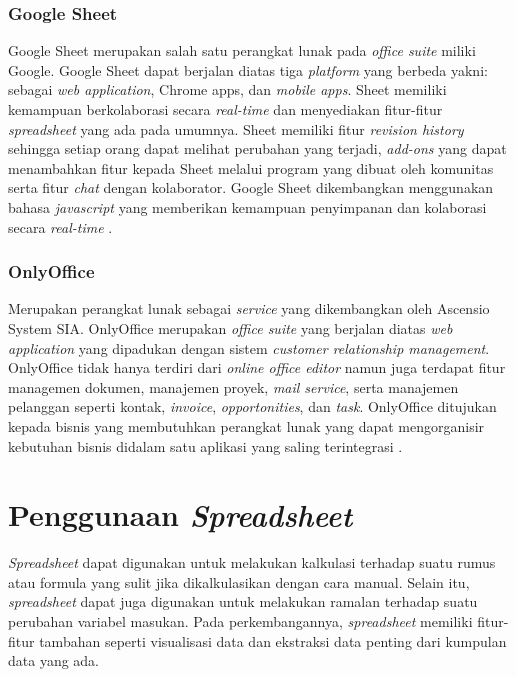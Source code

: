     \subsubsection{Google Sheet}
    Google Sheet merupakan salah satu perangkat lunak pada \textit{office suite} miliki Google. Google Sheet dapat berjalan diatas tiga \textit{platform} yang berbeda yakni: sebagai \textit{web application}, Chrome apps, dan \textit{mobile apps}. Sheet memiliki kemampuan berkolaborasi secara \textit{real-time} dan menyediakan fitur-fitur \textit{spreadsheet} yang ada pada umumnya. Sheet memiliki fitur \textit{revision history} sehingga setiap orang dapat melihat perubahan yang terjadi, \textit{add-ons} yang dapat menambahkan fitur kepada Sheet melalui program yang dibuat oleh komunitas serta fitur \textit{chat} dengan kolaborator. Google Sheet dikembangkan menggunakan bahasa \textit{javascript} yang memberikan kemampuan penyimpanan dan kolaborasi secara \textit{real-time} \citep{GoogleSheet}.

    \subsubsection{OnlyOffice}
    Merupakan perangkat lunak sebagai \textit{service} yang dikembangkan oleh Ascensio System SIA. OnlyOffice merupakan \textit{office suite} yang berjalan diatas \textit{web application} yang dipadukan dengan sistem \textit{customer relationship management}. OnlyOffice tidak hanya terdiri dari \textit{online office editor} namun juga terdapat fitur managemen dokumen, manajemen proyek, \textit{mail service}, serta manajemen pelanggan seperti kontak, \textit{invoice}, \textit{opportonities}, dan \textit{task}. OnlyOffice ditujukan kepada bisnis yang membutuhkan perangkat lunak yang dapat mengorganisir kebutuhan bisnis didalam satu aplikasi yang saling terintegrasi \citep{OnlyOffice}. 


\section{Penggunaan \textit{Spreadsheet}}
\textit{Spreadsheet} dapat digunakan untuk melakukan kalkulasi terhadap suatu rumus atau formula yang sulit jika dikalkulasikan dengan cara manual. Selain itu, \textit{spreadsheet} dapat juga digunakan untuk melakukan ramalan terhadap suatu perubahan variabel masukan. Pada perkembangannya, \textit{spreadsheet} memiliki fitur-fitur tambahan seperti visualisasi data dan ekstraksi data penting dari kumpulan data yang ada.

